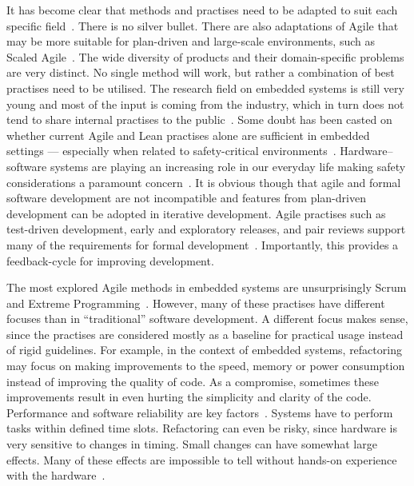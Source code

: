 \documentclass[english]{tktltiki2}
\begin{document}
It has become clear that methods and practises need to be adapted to suit each specific field~\cite{VB09, CWR10, HMP12, JLP12, KRM13}. There is no silver bullet. There are also adaptations of Agile that may be more suitable for plan-driven and large-scale environments, such as Scaled Agile~\cite{ScaledAgile}. The wide diversity of products and their domain-specific problems are very distinct. No single method will work, but rather a combination of best practises need to be utilised. The research field on embedded systems is still very young and most of the input is coming from the industry, which in turn does not tend to share internal practises to the public~\cite{KRM13}. Some doubt has been casted on whether current Agile and Lean practises alone are sufficient in embedded settings — especially when related to safety-critical environments~\cite{TFR02, EB12}. Hardware–software systems are playing an increasing role in our everyday life making safety considerations a paramount concern~\cite{CWR10}. It is obvious though that agile and formal software development are not incompatible and features from plan-driven development can be adopted in iterative development. Agile practises such as test-driven development, early and exploratory releases, and pair reviews support many of the requirements for formal development~\cite{TFR02, VB09, CWR10, JLP12}. Importantly, this provides a feedback-cycle for improving development.

The most explored Agile methods in embedded systems are unsurprisingly Scrum and Extreme Programming~\cite{KRM13}. However, many of these practises have different focuses than in “traditional” software development. A different focus makes sense, since the practises are considered mostly as a baseline for practical usage instead of rigid guidelines. For example, in the context of embedded systems, refactoring may focus on making improvements to the speed, memory or power consumption instead of improving the quality of code. As a compromise, sometimes these improvements result in even hurting the simplicity and clarity of the code. Performance and software reliability are key factors~\cite{RA03, EHS14}. Systems have to perform tasks within defined time slots. Refactoring can even be risky, since hardware is very sensitive to changes in timing. Small changes can have somewhat large effects. Many of these effects are impossible to tell without hands-on experience with the hardware~\cite{RA03}.
\end{document}
